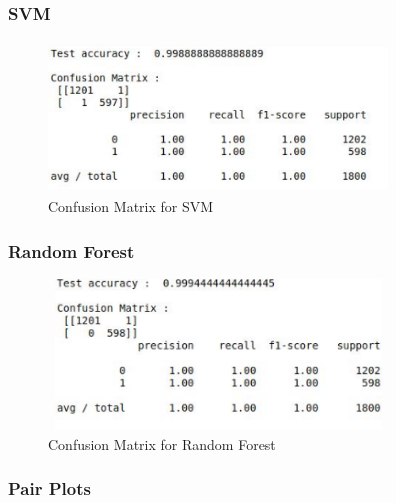 \subsubsection{SVM}

\begin{figure}[H]
  \includegraphics[height = 4cm,width= 9cm]{images/9_SVM}
\caption{Confusion Matrix for SVM}  
  \end{figure}

\subsubsection{Random Forest}

\begin{figure}[H]
  \includegraphics[height = 4cm,width= 9cm]{images/9_rand}
\caption{Confusion Matrix for Random Forest}
\end{figure}

\subsubsection{Pair Plots}

